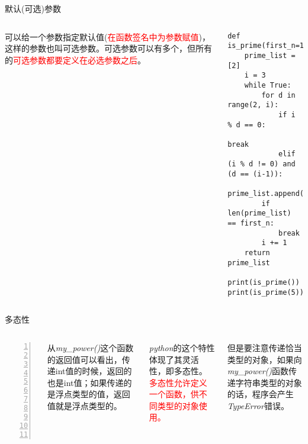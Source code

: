 \documentclass{beamer}
\begin{document}
\begin{frame}[fragile]{默认(可选)参数}
\begin{columns}

{\tiny 可以给一个参数指定默认值(\textcolor{red}{在函数签名中为参数赋值})，这样的参数也叫可选参数。可选参数可以有多个，但所有的\textcolor{red}{可选参数都要定义在必选参数之后}。}
\begin{Verbatim}[numbers=right,frame=single,rulecolor=\color{red}]
def is_prime(first_n=10):
    prime_list = [2]
    i = 3
    while True:
        for d in range(2, i):
            if i % d == 0:
                break
            elif (i % d != 0) and (d == (i-1)):
                prime_list.append(i)
        if len(prime_list) == first_n:
            break
        i += 1
    return prime_list

print(is_prime())
print(is_prime(5))
\end{Verbatim}

\end{columns}
\end{frame}


\begin{frame}[fragile]{多态性}
\begin{columns}
\begin{Verbatim}[numbers=left,frame=single,rulecolor=\color{red}]
import math

def my_power(a, b):
    return a**b
    
n1 = my_power(2,5)
n2 = my_power(math.pi, 1)
print(n1, n2)


32 3.141592653589793
\end{Verbatim}
从\textit{my\_power()}这个函数的返回值可以看出，传递int值的时候，返回的也是int值；如果传递的是浮点类型的值，返回值就是浮点类型的。

\textit{python}的这个特性体现了其灵活性，即多态性。\textcolor{red}{多态性允许定义一个函数，供不同类型的对象使用。}

但是要注意传递恰当类型的对象，如果向\textit{my\_power()}函数传递字符串类型的对象的话，程序会产生\textit{TypeError}错误。
\end{columns}
\end{frame}
\end{document}
